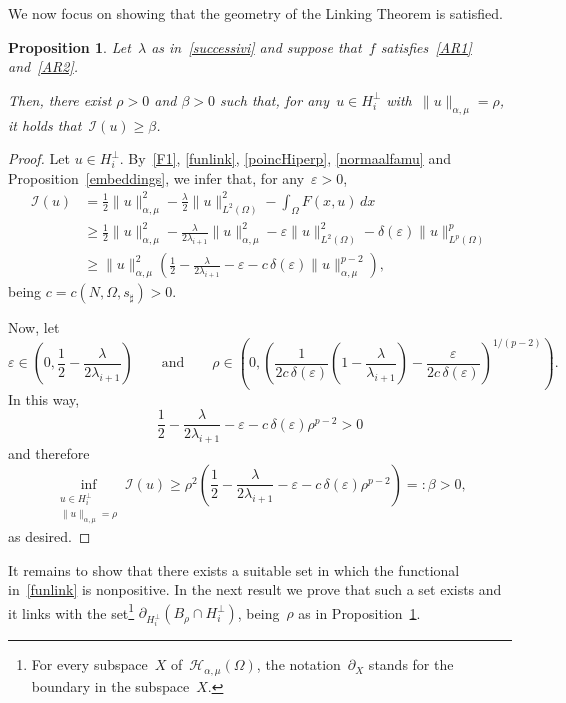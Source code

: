 \documentclass[12pt,a4paper,intlimits,sumlimits]{amsart}
\theoremstyle{definition}
\theoremstyle{plain}
\newtheorem{proposition}[definition]{Proposition}
\numberwithin{equation}{section}
\renewcommand{\geq}{\geqslant}
\begin{document}
We now focus on showing that the geometry of the Linking Theorem is satisfied.

\begin{proposition}\label{LGEO1}
Let~$\lambda$ as in~\eqref{successivi} and suppose that~$f$ satisfies~\eqref{AR1} and~\eqref{AR2}.

Then, there exist $\rho>0$ and $\beta>0$ such that, for any~$u\in H_i^\perp$ with~$\|u\|_{\alpha,\mu}=\rho$,
it holds that~$\mathcal{I}(u)\geq \beta$.
\end{proposition}

\begin{proof}
Let $u\in H_i^\perp$. By~\eqref{F1}, \eqref{funlink}, \eqref{poincHiperp}, \eqref{normaalfamu} and Proposition~\ref{embeddings}, we infer that, for any~$\varepsilon>0$,
\[
\begin{aligned}
\mathcal{I}(u)&=
\frac{1}{2}\|u\|_{{\alpha,\mu}}^2-\frac{\lambda}{2}\|u\|_{L^2(\Omega)}^2-\int_\Omega F(x,u)\,dx \\
&\geq \frac{1}{2}\|u\|_{{\alpha,\mu}}^2-\frac{\lambda}{2\lambda_{i+1}}\|u\|_{\alpha,\mu}^2-\varepsilon \|u\|_{L^2(\Omega)}^2-\delta(\varepsilon)\|u\|_{L^p(\Omega)}^p \\
&\geq \|u\|_{\alpha,\mu}^2\left(\frac{1}{2}- \frac{\lambda}{2\lambda_{i+1}}-\varepsilon-c\,\delta(\varepsilon) \|u\|_{\alpha,\mu}^{p-2}\right),
\end{aligned}
\]
being $c=c(N,\Omega,s_\sharp)>0$.

Now, let
\[
\varepsilon \in \left(0, \frac{1}{2}-\frac{\lambda}{2\lambda_{i+1}} \right)
\qquad{\mbox{and}}\qquad
\rho \in\left(0, \left(\frac{1}{2c\,\delta(\varepsilon)}\left(1-\frac{\lambda}{\lambda_{i+1}}\right) -\frac{\varepsilon}{2c\,\delta(\varepsilon)}\right)^{1/(p-2)}\right).
\]
In this way,
\[
\frac{1}{2}- \frac{\lambda}{2\lambda_{i+1}}-\varepsilon
-c\,\delta(\varepsilon) \rho^{p-2}>0
\]
and therefore
\[
\inf_{\substack{u\in H_i^{\perp} \\ \|u\|_{\alpha, \mu}=\rho}} \mathcal{I}(u)
\geq \rho^2\left(
\frac{1}{2}- \frac{\lambda}{2\lambda_{i+1}}-\varepsilon
-c\,\delta(\varepsilon)\rho^{p-2}
\right)=:\beta>0,
\]
as desired.
\end{proof}

It remains to show that there exists a suitable set in which the functional in~\eqref{funlink} is nonpositive.  In the next result we prove that such a set exists and it links with the set\footnote{For every subspace~$X$ of~$\mathcal H_{\alpha, \mu}(\Omega)$, the notation~$\partial_X$ stands for the boundary in the subspace~$X$.} $\partial_{H_i^\perp}(B_\rho\cap H_i^\perp)$, being~$\rho$ as in Proposition~\ref{LGEO1}.
\end{document}
